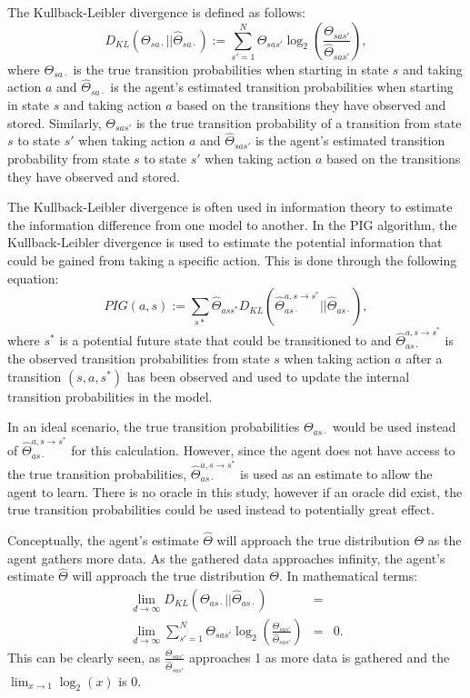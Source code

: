 \documentclass[letterpaper]{article} %
\begin{document}
The Kullback-Leibler divergence is defined as follows:
\[D_{KL} (\Theta_{sa\cdot} || \hat{\Theta}_{sa\cdot}) := \sum_{s' = 1}^{ N} \Theta_{sas'} \log_{2}\left(\frac{\Theta_{sas'}}{\hat{\Theta}_{sas'}}\right),   \]
where $\Theta_{sa\cdot}$ is the true transition probabilities when starting in state $s$ and taking action $a$ and $\hat{\Theta}_{sa\cdot}$ is the agent's estimated transition probabilities when starting in state $s$ and taking action $a$  based on the transitions they have observed and stored. Similarly, $\Theta_{sas'}$ is the true transition probability of a transition from state $s$ to state $s'$ when taking action $a$ and $\hat{\Theta}_{sas'}$ is the agent's estimated transition probability from state $s$ to state $s'$ when taking action $a$ based on the transitions they have observed and stored.

The Kullback-Leibler divergence is often used in information theory to estimate the information difference from one model to another. In the PIG algorithm, the Kullback-Leibler divergence is used to estimate the potential information that could be gained from taking a specific action.
This is done through the following equation:
\[ PIG(a,s) :=  \sum_{s*} \hat{\Theta}_{ass^{*}}D_{KL}(\hat{\Theta}_{as\cdot}^{a,s \rightarrow s^{*}} || \hat{\Theta}_{as\cdot}), \]
where $s^{*}$ is a potential future state that could be transitioned to and $\hat{\Theta}_{as\cdot}^{a,s \rightarrow s^{*}}$ is the observed transition probabilities from state $s$ when taking action $a$ after a transition $(s,a,s^{*})$ has been observed and used to update the internal transition probabilities in the model.

In an ideal scenario, the true transition probabilities $\Theta_{as\cdot}$ would be used instead of $\hat{\Theta}_{as\cdot}^{a,s \rightarrow s^{*}}$ for this calculation. However, since the agent does not have access to the true transition probabilities, $\hat{\Theta}_{as\cdot}^{a,s \rightarrow s^{*}}$ is used as an estimate to allow the agent to learn. There is no oracle in this study, however if an oracle did exist, the true transition probabilities could be used instead to potentially great effect.

Conceptually, the agent's estimate $\hat{\Theta}$ will approach the true distribution $\Theta$ as the agent gathers more data. As the gathered data approaches infinity, the agent's estimate $\hat{\Theta}$ will approach the true distribution $\Theta$. In mathematical terms:
\begin{eqnarray*}
  \lim_{d \rightarrow \infty} D_{KL}( \Theta_{as\cdot} || \hat{\Theta}_{as\cdot}) &=& \\ \lim_{d \rightarrow \infty} \sum_{s' = 1}^{ N} \Theta_{sas'} \log_{2}\left(\frac{\Theta_{sas'}}{\hat{\Theta}_{sas'}}\right) &=& 0.
\end{eqnarray*}
This can be clearly seen, as $\frac{\Theta_{sas'}}{\hat{\Theta}_{sas'}}$ approaches 1 as more data is gathered and the $\lim_{x \rightarrow 1} \log_{2}(x)$ is 0.
\end{document}
